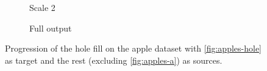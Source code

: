 \begin{figure}
\begin{subfigure}{0.2\linewidth}
\caption{Scale 2}
\label{fig:applescale2}
\end{subfigure}
\hfill
\begin{subfigure}{0.2\linewidth}
\caption{Full output}
\label{fig:applefull}
\end{subfigure}
\caption{Progression of the hole fill on the apple dataset with \ref{fig:apples-hole} as target and the rest (excluding \ref{fig:apples-a}) as sources.}
\label{fig:applefill}
\end{figure}

